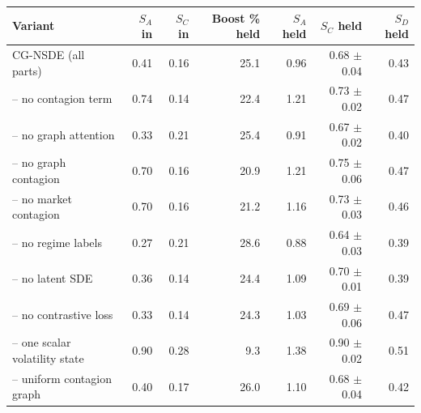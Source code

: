\begin{tabular}{lrrrrrr}
\toprule
Variant & $S_A$ in & $S_C$ in & Boost \% held & $S_A$ held & $S_C$ held & $S_D$ held \\
\midrule
CG-NSDE (all parts) & 0.41 & 0.16 & 25.1 & 0.96 & 0.68 $\pm$ 0.04 & 0.43 \\
-- no contagion term & 0.74 & 0.14 & 22.4 & 1.21 & 0.73 $\pm$ 0.02 & 0.47 \\
-- no graph attention & 0.33 & 0.21 & 25.4 & 0.91 & 0.67 $\pm$ 0.02 & 0.40 \\
-- no graph contagion & 0.70 & 0.16 & 20.9 & 1.21 & 0.75 $\pm$ 0.06 & 0.47 \\
-- no market contagion & 0.70 & 0.16 & 21.2 & 1.16 & 0.73 $\pm$ 0.03 & 0.46 \\
-- no regime labels & 0.27 & 0.21 & 28.6 & 0.88 & 0.64 $\pm$ 0.03 & 0.39 \\
-- no latent SDE & 0.36 & 0.14 & 24.4 & 1.09 & 0.70 $\pm$ 0.01 & 0.39 \\
-- no contrastive loss & 0.33 & 0.14 & 24.3 & 1.03 & 0.69 $\pm$ 0.06 & 0.47 \\
-- one scalar volatility state & 0.90 & 0.28 & 9.3 & 1.38 & 0.90 $\pm$ 0.02 & 0.51 \\
-- uniform contagion graph & 0.40 & 0.17 & 26.0 & 1.10 & 0.68 $\pm$ 0.04 & 0.42 \\
\bottomrule
\end{tabular}
